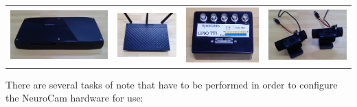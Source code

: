\begin{center}
\begin{tabular}{cccc}
\includegraphics[height=0.14\textwidth]{pics-system/sys-comp-front.jpg} &
\includegraphics[height=0.14\textwidth]{pics-system/sys-router-front.jpg} &
\includegraphics[height=0.14\textwidth]{pics-system/sys-gpio.jpg} &
\includegraphics[height=0.14\textwidth]{pics-system/sys-cameras.jpg} \\
\end{tabular}
\end{center}

\clearpage

There are several tasks of note that have to be performed in order to
configure the NeuroCam hardware for use:

